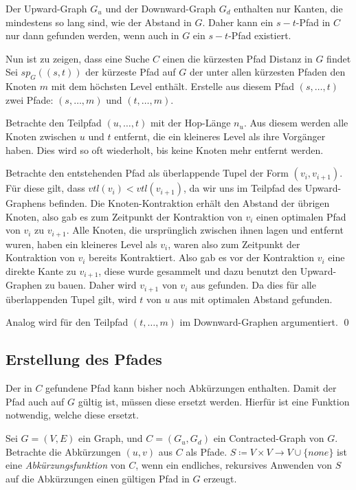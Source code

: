 \begin{beweis}\label{ch:proof:correct}
    Der Upward-Graph $G_u$ und der Downward-Graph $G_d$ enthalten nur Kanten, die mindestens so lang sind, wie der Abstand in $G$.
    Daher kann ein $s-t$-Pfad in $C$ nur dann gefunden werden, wenn auch in $G$ ein $s-t$-Pfad existiert.

    Nun ist zu zeigen, dass eine Suche $C$ einen die kürzesten Pfad Distanz in $G$ findet
    Sei ${sp}_G((s, t))$ der kürzeste Pfad auf $G$ der unter allen kürzesten Pfaden den Knoten $m$ mit dem höchsten Level enthält.
    Erstelle aus diesem Pfad $(s, \dotsc, t)$ zwei Pfade: $(s, \dotsc, m)$ und $(t, \dotsc, m)$.

    Betrachte den Teilpfad $(u, \dotsc, t)$ mit der Hop-Länge $n_u$.
    Aus diesem werden alle Knoten zwischen $u$ und $t$ entfernt, die ein kleineres Level als ihre Vorgänger haben.
    Dies wird so oft wiederholt, bis keine Knoten mehr entfernt werden.

    Betrachte den entstehenden Pfad als überlappende Tupel der Form $(v_{i}, v_{i + 1})$.
    Für diese gilt, dass ${vtl}(v_i) < {vtl}(v_{i + 1})$, da wir uns im Teilpfad des Upward-Graphens befinden.
    Die Knoten-Kontraktion erhält den Abstand der übrigen Knoten, also gab es zum Zeitpunkt der Kontraktion von $v_i$ einen optimalen Pfad von $v_i$ zu $v_{i + 1}$.
    Alle Knoten, die ursprünglich zwischen ihnen lagen und entfernt wuren, haben ein kleineres Level als $v_i$, waren also zum Zeitpunkt der Kontraktion von $v_i$ bereits Kontraktiert.
    Also gab es vor der Kontraktion $v_i$ eine direkte Kante zu $v_{i + 1}$, diese wurde gesammelt und dazu benutzt den Upward-Graphen zu bauen.
    Daher wird $v_{i + 1}$ von $v_i$ aus gefunden.
    Da dies für alle überlappenden Tupel gilt, wird $t$ von $u$ aus mit optimalen Abstand gefunden.

    Analog wird für den Teilpfad $(t, \dotsc, m)$ im Downward-Graphen argumentiert.
    \qed
\end{beweis}

\subsection{Erstellung des Pfades}\label{ch:subsection:pfad_gewinnung}

Der in $C$ gefundene Pfad kann bisher noch Abkürzungen enthalten.
Damit der Pfad auch auf $G$ gültig ist, müssen diese ersetzt werden.
Hierfür ist eine Funktion notwendig, welche diese ersetzt.

\begin{definition}[Abkürzungsfunktion]
    Sei $G = (V, E)$ ein Graph, und $C = (G_u, G_d)$ ein Contracted-Graph von $G$.
    Betrachte die Abkürzungen $(u, v)$ aus $C$ als Pfade.
    $S \coloneq V \times V \to V \cup \{ {none} \}$ ist eine \emph{Abkürzungsfunktion} von $C$, wenn ein endliches, rekursives Anwenden von $S$ auf die Abkürzungen einen gültigen Pfad in $G$ erzeugt.
\end{definition}

